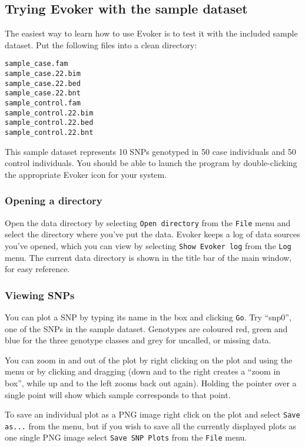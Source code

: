 \documentclass{article}
\begin{document}
\subsection{Trying Evoker with the sample dataset}

The easiest way to learn how to use Evoker is to test it with the included sample dataset. Put the following files into a clean directory:

\begin{verbatim}
sample_case.fam
sample_case.22.bim
sample_case.22.bed
sample_case.22.bnt
sample_control.fam
sample_control.22.bim
sample_control.22.bed
sample_control.22.bnt
\end{verbatim}

This sample dataset represents 10 SNPs genotyped in 50 case individuals and 50 control individuals. You should be able to launch the program by double-clicking the appropriate Evoker icon for your system.

\subsubsection{Opening a directory}
Open the data directory by selecting \texttt{Open directory} from the \texttt{File} menu and select the directory where you've put the data. Evoker keeps a log of data sources you've opened, which you can view by selecting \texttt{Show Evoker log} from the \texttt{Log} menu. The current data directory is shown in the title bar of the main window, for easy reference.

\subsubsection{Viewing SNPs}
You can plot a SNP by typing its name in the box and clicking \texttt{Go}. Try ``snp0'', one of the SNPs in the sample dataset. Genotypes are coloured red, green and blue for the three genotype classes and grey for uncalled, or missing data. 

You can zoom in and out of the plot by right clicking on the plot and using the menu or by clicking and dragging (down and to the right creates a ``zoom in box'', while up and to the left zooms back out again). Holding the pointer over a single point will show which sample corresponds to that point.

To save an individual plot as a PNG image right click on the plot and select \texttt{Save as...} from the menu, but if you wish to save all the currently displayed plots as one single PNG image select \texttt{Save SNP Plots} from the \texttt{File} menu.
\end{document}
